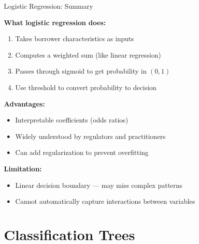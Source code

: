\documentclass[10pt]{beamer}
\begin{document}
\begin{frame}{Logistic Regression: Summary}

  \textbf{What logistic regression does:}
  \begin{enumerate}
    \item Takes borrower characteristics as inputs
    \item Computes a weighted sum (like linear regression)
    \item Passes through sigmoid to get probability in $(0, 1)$
    \item Use threshold to convert probability to decision
  \end{enumerate}

  \vspace{1em}
  \textbf{Advantages:}
  \begin{itemize}
    \item Interpretable coefficients (odds ratios)
    \item Widely understood by regulators and practitioners
    \item Can add regularization to prevent overfitting
  \end{itemize}

  \vspace{0.5em}
  \textbf{Limitation:}
  \begin{itemize}
    \item Linear decision boundary --- may miss complex patterns
    \item Cannot automatically capture interactions between variables
  \end{itemize}
\end{frame}

\section{Classification Trees}
\end{document}
